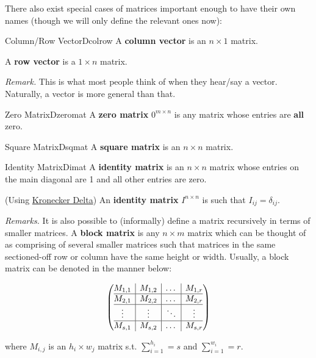 \documentclass[oneside]{book}
\begin{document}
	There also exist special cases of matrices important enough to have their own names (though we will only define the relevant ones now):
	
	\begin{defn}{Column/Row Vector}{Dcolrow}
		A \textbf{column vector} is an $n \times 1$ matrix.
		
		A \textbf{row vector} is a $1 \times n$ matrix.
	\end{defn}
	\textit{Remark.} This is what most people think of when they hear/say a vector. Naturally, a vector is more general than that.
	\begin{defn}{Zero Matrix}{Dzeromat}
		A \textbf{zero matrix} $0^{m \times n}$ is any matrix whose entries are \textbf{all} zero.
	\end{defn}
	\begin{defn}{Square Matrix}{Dsqmat}
		A \textbf{square matrix} is an $n \times n$ matrix.
	\end{defn}
	\begin{defn}{Identity Matrix}{Dimat}
		A \textbf{identity matrix} is an $n \times n$ matrix whose entries on the main diagonal are 1 and all other entries are zero.
		
		(Using \href{https://en.wikipedia.org/wiki/Kronecker_delta}{Kronecker Delta}) An \textbf{identity matrix} $I^{n \times n}$ is such that $I_{ij}=\delta_{ij}$.
	\end{defn}

	\textit{Remarks.} It is also possible to (informally) define a matrix recursively in terms of smaller matrices. A \textbf{block matrix} is any $n \times m$ matrix which can be thought of as comprising of several smaller matrices such that matrices in the same sectioned-off row or column have the same height or width. Usually, a block matrix can be denoted in the manner below:
	
	$$\left(\begin{array}{@{}c|c|c|c@{}}
		M_{1,1} & M_{1,2} & \dots & M_{1, r} \\ \hline
		M_{2,1} & M_{2,2} & \dots & M_{2, r} \\ \hline
		\vdots & \vdots & \ddots & \vdots \\ \hline
		M_{s,1} & M_{s,2} & \dots & M_{s, r} \\
		\end{array}\right)$$
	
	where $M_{i,j}$ is an $h_i \times w_j$ matrix s.t. $\sum_{i=1}^{h_i} = s$ and $\sum_{i=1}^{w_i} = r$.
	
	\newpage
	
\end{document}
